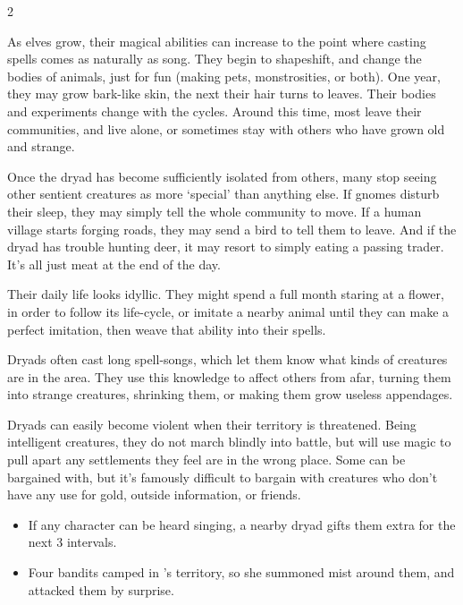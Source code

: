\begin{multicols}{2}

\noindent
As elves grow, their magical abilities can increase to the point where casting spells comes as naturally as song.
They begin to shapeshift, and change the bodies of animals, just for fun (making pets, monstrosities, or both).
One year, they may grow bark-like skin, the next their hair turns to leaves.
Their bodies and experiments change with the \glspl{cycle}.
Around this time, most leave their communities, and live alone, or sometimes stay with others who have grown old and strange.

Once the \gls{dryad} has become sufficiently isolated from others, many stop seeing other sentient creatures as more `special' than anything else.
If gnomes disturb their sleep, they may simply tell the whole community to move.
If a human \gls{village} starts forging roads, they may send a bird to tell them to leave.
And if the \gls{dryad} has trouble hunting deer, it may resort to simply eating a passing trader.
It's all just meat at the end of the day.

Their daily life looks idyllic.
They might spend a full month staring at a flower, in order to follow its life-cycle, or imitate a nearby animal until they can make a perfect imitation, then weave that ability into their spells.

Dryads often cast long spell-songs, which let them know what kinds of creatures are in the area.
They use this knowledge to affect others from afar, turning them into strange creatures, shrinking them, or making them grow useless appendages.

Dryads can easily become violent when their territory is threatened.
Being intelligent creatures, they do not march blindly into battle, but will use magic to pull apart any settlements they feel are in the wrong place.
Some can be bargained with, but it's famously difficult to bargain with creatures who don't have any use for gold, outside information, or friends.

\dryad

\showStdSpells

\showEnc[\El]

\begin{itemize}

  \item
  If any character can be heard singing, a nearby \gls{dryad} gifts them extra  for the next 3 \glspl{interval}.
  \item
  Four bandits camped in 's territory, so she summoned mist around them, and attacked them by surprise.


\end{itemize}
\end{multicols}
